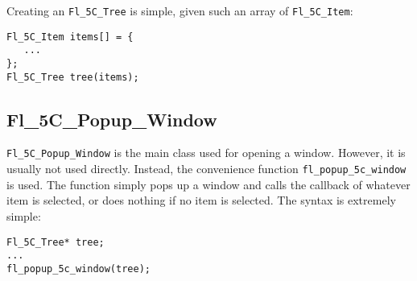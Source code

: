 Creating an \texttt{Fl\_5C\_Tree} is simple, given such an array of
\texttt{Fl\_5C\_Item}:

\begin{samepage}
\begin{verbatim}
Fl_5C_Item items[] = {
   ...
};
Fl_5C_Tree tree(items);
\end{verbatim}
\end{samepage}

\subsection{Fl\_5C\_Popup\_Window}

\texttt{Fl\_5C\_Popup\_Window} is the main class used for opening a \fc{}
window.  However, it is usually not used directly.  Instead, the convenience
function \texttt{fl\_popup\_5c\_window} is used.  The function simply pops up
a window and calls the callback of whatever item is selected, or does nothing
if no item is selected.  The syntax is extremely simple:

\begin{samepage}
\begin{verbatim}
Fl_5C_Tree* tree;
...
fl_popup_5c_window(tree);
\end{verbatim}
\end{samepage}
